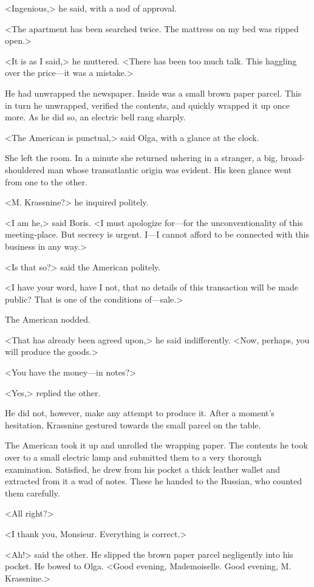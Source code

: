 <Ingenious,> he said, with a nod of approval.

<The apartment has been searched twice. The mattress on my bed was ripped open.>

<It is as I said,> he muttered. <There has been too much talk. This haggling over the price—it was a mistake.>

He had unwrapped the newspaper. Inside was a small brown paper parcel. This in turn he unwrapped, verified the contents, and quickly wrapped it up once more. As he did so, an electric bell rang sharply.

<The American is punctual,> said Olga, with a glance at the clock.

She left the room. In a minute she returned ushering in a stranger, a big, broad-shouldered man whose transatlantic origin was evident. His keen glance went from one to the other.

<M. Krassnine?> he inquired politely.

<I am he,> said Boris. <I must apologize for—for the unconventionality of this meeting-place. But secrecy is urgent. I—I cannot afford to be connected with this business in any way.>

<Is that so?> said the American politely.

<I have your word, have I not, that no details of this transaction will be made public? That is one of the conditions of—sale.>

The American nodded.

<That has already been agreed upon,> he said indifferently. <Now, perhaps, you will produce the goods.>

<You have the money—in notes?>

<Yes,> replied the other.

He did not, however, make any attempt to produce it. After a moment's hesitation, Krassnine gestured towards the small parcel on the table.

The American took it up and unrolled the wrapping paper. The contents he took over to a small electric lamp and submitted them to a very thorough examination. Satisfied, he drew from his pocket a thick leather wallet and extracted from it a wad of notes. These he handed to the Russian, who counted them carefully.

<All right?>

<I thank you, Monsieur. Everything is correct.>

<Ah!> said the other. He slipped the brown paper parcel negligently into his pocket. He bowed to Olga. <Good evening, Mademoiselle. Good evening, M. Krassnine.>

